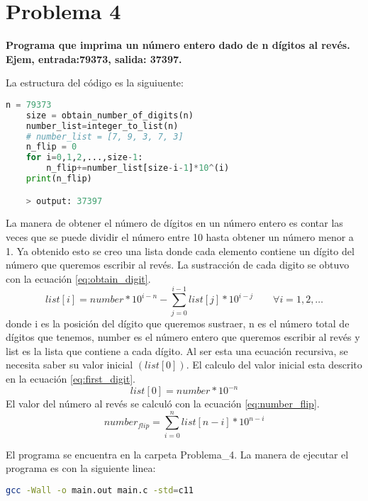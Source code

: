\section*{Problema 4}
\textbf{Programa que imprima un número entero dado de n dígitos al revés. Ejem, entrada:79373, salida: 37397.}

La estructura del código es la siguiuente:
\begin{lstlisting}[language=python]
    n = 79373
    size = obtain_number_of_digits(n)
    number_list=integer_to_list(n)
    # number_list = [7, 9, 3, 7, 3]
    n_flip = 0
    for i=0,1,2,...,size-1:
        n_flip+=number_list[size-i-1]*10^(i)
    print(n_flip)

    > output: 37397
\end{lstlisting}

La manera de obtener el número de dígitos en un número entero es contar las veces que se puede dividir el número entre 10 hasta obtener un número menor a 1. Ya obtenido esto se creo una lista donde cada elemento contiene un dígito del número que queremos escribir al revés. La sustracción de cada digito se obtuvo con la ecuación \ref{eq:obtain_digit}.
\begin{equation}
    list[i]=number*10^{i-n}- \sum_{j=0}^{i-1} list[j] * 10^{i-j} \qquad \forall i=1,2,\dots
    \label{eq:obtain_digit}
\end{equation}
donde  i es la posición del dígito que queremos sustraer, n es el número total de dígitos que tenemos, number es el número entero que queremos escribir al revés y list es la lista que contiene a cada dígito. Al ser esta una ecuación recursiva, se necesita saber su valor inicial $(list[0])$. El calculo del valor inicial esta descrito en la ecuación \ref{eq:first_digit}.
\begin{equation}
    list[0] = number *10^{-n}
    \label{eq:first_digit}
\end{equation}
El valor del número al revés se calculó con la ecuación \ref{eq:number_flip}.
\begin{equation}
    number_{flip} = \sum_{i=0}^{n} list[n-i]*10^{n-i}
    \label{eq:number_flip}
\end{equation}

El programa se encuentra en la carpeta \textcolor{citecolor}{Problema\_4}. La manera de ejecutar el programa es con la siguiente linea:
\begin{lstlisting}[language=bash]
    gcc -Wall -o main.out main.c -std=c11
\end{lstlisting}